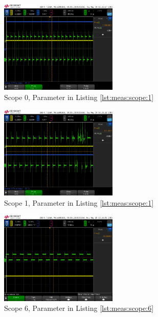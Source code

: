\begin{figure}[h!tb]
    \centering
    \includegraphics[width=0.5\textwidth]{images/scopeShots/scope_0.png}
    \caption{Scope 0, Parameter in Listing \ref{lst:meas:scope:1}}
    \label{fig:meas:scope:0}
\end{figure}

\begin{figure}[h!tb]
    \centering
    \includegraphics[width=0.5\textwidth]{images/scopeShots/scope_1.png}
    \caption{Scope 1, Parameter in Listing \ref{lst:meas:scope:1}}
    \label{fig:meas:scope:1}
\end{figure}

\begin{figure}[h!tb]
    \centering
    \includegraphics[width=0.5\textwidth]{images/scopeShots/scope_6.png}
    \caption{Scope 6, Parameter in Listing \ref{lst:meas:scope:6}}
    \label{fig:meas:scope:6}
\end{figure}

